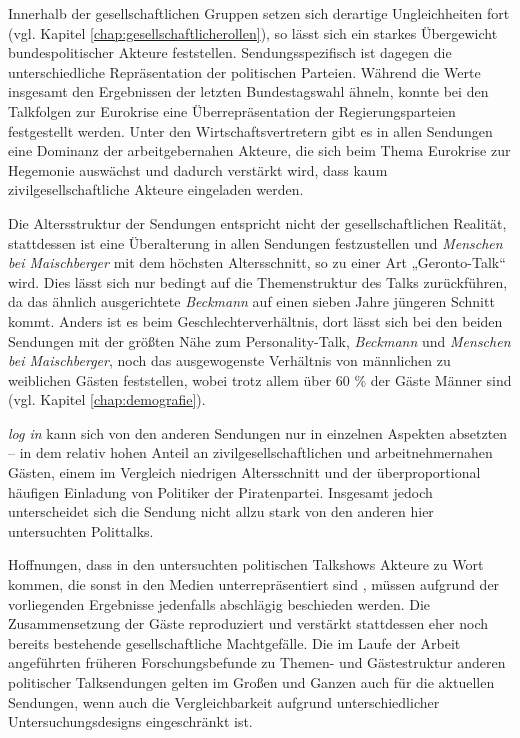 Innerhalb der gesellschaftlichen Gruppen setzen sich derartige Ungleichheiten fort (vgl. Kapitel \vref{chap:gesellschaftlicherollen}), so lässt sich ein starkes Übergewicht bundespolitischer Akteure feststellen. Sendungsspezifisch ist dagegen die unterschiedliche Repräsentation der politischen Parteien. Während die Werte insgesamt den Ergebnissen der letzten Bundestagswahl ähneln, konnte bei den Talkfolgen zur Eurokrise eine Überrepräsentation der Regierungsparteien festgestellt werden. Unter den Wirtschaftsvertretern gibt es in allen Sendungen eine Dominanz der arbeitgebernahen Akteure, die sich beim Thema Eurokrise zur Hegemonie auswächst und dadurch verstärkt wird, dass kaum zivilgesellschaftliche Akteure eingeladen werden.

Die Altersstruktur der Sendungen entspricht nicht der gesellschaftlichen Realität, stattdessen ist eine Überalterung in allen Sendungen festzustellen und \textit{Menschen bei Maischberger} mit dem höchsten Altersschnitt, so zu einer Art „Geronto-Talk“ wird. Dies lässt sich nur bedingt auf die Themenstruktur des Talks zurückführen, da das ähnlich ausgerichtete \textit{Beckmann} auf einen sieben Jahre jüngeren Schnitt kommt. Anders ist es beim Geschlechterverhältnis, dort lässt sich bei den beiden Sendungen mit der größten Nähe zum Personality-Talk, \textit{Beckmann} und \textit{Menschen bei Maischberger}, noch das ausgewogenste Verhältnis von männlichen zu weiblichen Gästen feststellen, wobei trotz allem über 60 \% der Gäste Männer sind (vgl. Kapitel \vref{chap:demografie}).

\textit{log in} kann sich von den anderen Sendungen nur in einzelnen Aspekten absetzten – in dem relativ hohen Anteil an zivilgesellschaftlichen und arbeitnehmernahen Gästen, einem im Vergleich niedrigen Altersschnitt und der überproportional häufigen Einladung von Politiker der Piratenpartei. Insgesamt jedoch unterscheidet sich die Sendung nicht allzu stark von den anderen hier untersuchten Polittalks.

Hoffnungen, dass in den untersuchten politischen Talkshows Akteure zu Wort kommen, die sonst in den Medien unterrepräsentiert sind \parencite[386]{richardsonSpecificDebateFormats2008}, müssen aufgrund der vorliegenden Ergebnisse jedenfalls abschlägig beschieden werden. Die Zusammensetzung der Gäste reproduziert und verstärkt stattdessen eher noch bereits bestehende gesellschaftliche Machtgefälle. Die im Laufe der Arbeit angeführten früheren Forschungsbefunde zu Themen- und Gästestruktur anderen politischer Talksendungen gelten im Großen und Ganzen auch für die aktuellen Sendungen, wenn auch die Vergleichbarkeit aufgrund unterschiedlicher Untersuchungsdesigns eingeschränkt ist.

